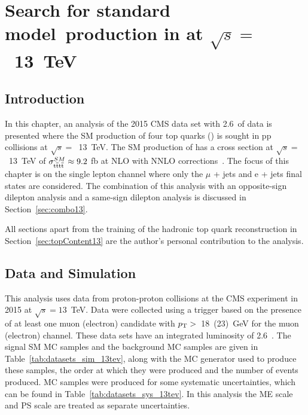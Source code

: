 \chapter{Search for standard model~\tttt production in \runtwo at $\sqrt{s} =$~13~TeV \label{c:Run2}}
\section{Introduction}
In this chapter, an analysis of the 2015 CMS data set with 2.6~\fbinv of data is presented where the SM production of four top quarks (\tttt) is sought in pp collisions at $\sqrt{s} =$~13~TeV. The SM production of \tttt has a cross section at $\sqrt{s} =$~13~TeV of $\sigma_{{\mathrm{t}\overline{\mathrm{t}}\mathrm{t}\overline{\mathrm{t}}}}^{SM}  \approx 9.2$ fb at NLO with NNLO corrections~\cite{Alwall2014,Bevilacqua2012}. The focus of this chapter is on the single lepton channel where only the $\mu$ + jets and e + jets final states are considered. The combination of this analysis with an opposite-sign dilepton analysis and a same-sign dilepton analysis is discussed in Section~\ref{sec:combo13}.

All sections apart from the training of the hadronic top quark reconstruction in Section~\ref{sec:topContent13} are the author's personal contribution to the analysis.

\section{Data and Simulation}
\label{sec:datasimulation13}
This analysis uses data from proton-proton collisions at the CMS experiment in 2015 at $\sqrt{s}=13$~TeV.
Data were collected using a trigger based on the presence of at least one muon (electron) candidate with $p_{\mathrm{T}} > $~18~(23)~GeV for the muon (electron) channel. These data sets have an integrated luminosity of 2.6~\fbinv .
The signal SM \tttt MC samples and the background MC samples are given in Table~\ref{tab:datasets_sim_13tev}, along with the MC generator used to produce these samples, the order at which they were produced and the number of events produced. MC samples were produced for some systematic uncertainties, which can be found in Table~\ref{tab:datasets_sys_13tev}. In this analysis the ME scale and PS scale are treated as separate uncertainties.

